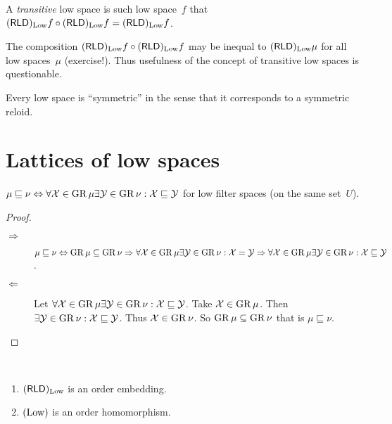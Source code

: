 \begin{defn}
A \emph{transitive} low space is such low space~$f$ that $(\mathsf{RLD})_{\operatorname{Low}}f\circ(\mathsf{RLD})_{\operatorname{Low}}f=(\mathsf{RLD})_{\operatorname{Low}}f$.
\end{defn}

\begin{rem}
The composition $(\mathsf{RLD})_{\operatorname{Low}}f\circ(\mathsf{RLD})_{\operatorname{Low}}f$ may be inequal to $(\mathsf{RLD})_{\operatorname{Low}}\mu$ for all low spaces~$\mu$ (exercise!).
Thus usefulness of the concept of transitive low spaces is questionable.
\end{rem}

\begin{rem}
Every low space is ``symmetric'' in the sense that it corresponds to a symmetric reloid.
\end{rem}

\section{Lattices of low spaces}

\begin{prop}\label{ls-order2}
$\mu \sqsubseteq \nu \Leftrightarrow \forall \mathcal{X}\in\operatorname{GR}\mu \exists\mathcal{Y}\in\operatorname{GR}\nu: \mathcal{X}\sqsubseteq\mathcal{Y}$ for
low filter spaces (on the same set~$U$).
\end{prop}

\begin{proof}
~
\begin{description}
\item[$\Rightarrow$] $\mu \sqsubseteq \nu \Leftrightarrow \operatorname{GR}\mu\subseteq\operatorname{GR}\nu \Rightarrow
  \forall \mathcal{X}\in\operatorname{GR}\mu \exists\mathcal{Y}\in\operatorname{GR}\nu: \mathcal{X}=\mathcal{Y} \Rightarrow
  \forall \mathcal{X}\in\operatorname{GR}\mu \exists\mathcal{Y}\in\operatorname{GR}\nu: \mathcal{X}\sqsubseteq\mathcal{Y}$.
\item[$\Leftarrow$] Let $\forall \mathcal{X}\in\operatorname{GR}\mu \exists\mathcal{Y}\in\operatorname{GR}\nu: \mathcal{X}\sqsubseteq\mathcal{Y}$.
  Take $\mathcal{X}\in\operatorname{GR}\mu$. Then $\exists\mathcal{Y}\in\operatorname{GR}\nu: \mathcal{X}\sqsubseteq\mathcal{Y}$. Thus $\mathcal{X}\in\operatorname{GR}\nu$.
  So $\operatorname{GR}\mu\subseteq\operatorname{GR}\nu$ that is $\mu \sqsubseteq \nu$.
\end{description}
\end{proof}

\begin{obvious}
~
\begin{enumerate}
\item $(\mathsf{RLD})_{\operatorname{Low}}$ is an order embedding.
\item $(\operatorname{Low})$ is an order homomorphism.
\end{enumerate}
\end{obvious}

